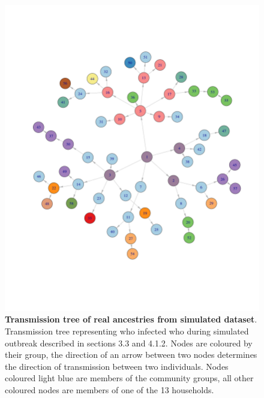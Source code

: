 \documentclass[11pt,a4paper]{report}
\begin{document}
\begin{figure}
\centering
\includegraphics[scale=0.45]{ancestree.png} \newline
\caption{{\bf Transmission tree of real ancestries from simulated dataset}. Transmission tree representing who infected who during simulated outbreak described in sections 3.3 and 4.1.2. Nodes are coloured by their group, the direction of an arrow between two nodes determines the direction of transmission between two individuals. Nodes coloured light blue are members of the community groups, all other coloured nodes are members of one of the 13 households.}
\end{figure}
\end{document}
